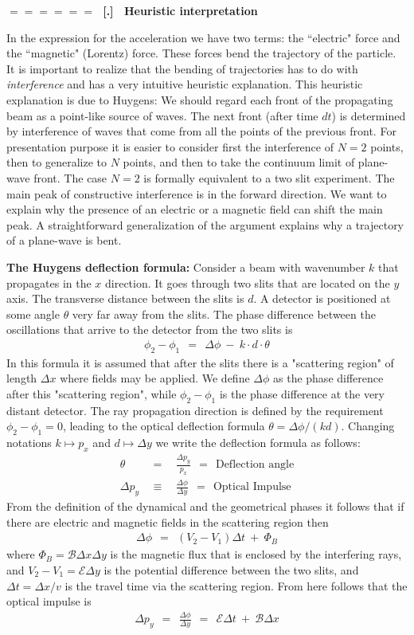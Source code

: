 \documentclass[onecolumn,fleqn]{revtex4}
\newcommand{\beq}{\begin{eqnarray}}
\newcommand{\eeq}{\end{eqnarray}}
\renewcommand{\thesubsection}{\arabic{subsection}}
\renewcommand{\thesubsubsection}{\arabic{subsubsection}}
\newcommand{\sheadC}[1]
{
\addtocounter{subsubsection}{1}
\vspace{5mm}
{\Large\bf $=\!=\!=\!=\!=\!=\;$ [\thesubsection.\thesubsubsection] \ #1}  
\nopagebreak
\phantomsection
}
\begin{document}
 
\sheadC{Heuristic interpretation}

In the expression for the acceleration we have two terms: 
the ``electric" force and the ``magnetic" (Lorentz) force.
These forces bend the trajectory of the particle.   
It is important to realize that the bending of trajectories 
has to do with {\em interference} and has a very intuitive 
heuristic explanation. This heuristic explanation is due to 
Huygens: We should regard each front of the propagating 
beam as a point-like source of waves. The next front (after time $dt$) 
is determined by interference of waves that come from all 
the points of the previous front. For presentation purpose 
it is easier to consider first the interference of $N=2$ points, 
then to generalize to $N$ points, and then to take 
the continuum limit of plane-wave front. 
The case $N=2$ is formally equivalent to a two slit experiment. 
The main peak of constructive interference is in the 
forward direction. We want to explain why the presence of 
an electric or a magnetic field can shift the main peak. 
A straightforward generalization of the argument explains 
why a trajectory of a plane-wave is bent. 


{\bf The Huygens deflection formula:}
Consider a beam with wavenumber $k$ that propagates in the $x$ direction.
It goes through two slits that are located on the $y$ axis. 
The transverse distance between the slits is ${d}$. 
A detector is positioned at some angle $\theta$ very far away from the slits.
The phase difference between the oscillations 
that arrive to the detector from the two slits is  
\beq
\phi_2-\phi_1 \ \ = \ \ \Delta \phi \ - \ k \cdot d \cdot \theta 
\eeq
In this formula it is assumed that after the slits there 
is a "scattering region" of length $\Delta x$ where fields 
may be applied. We define $\Delta \phi$ as the phase difference 
after this "scattering region", while  ${\phi_2-\phi_1}$ is the 
phase difference at the very distant detector.   
The ray propagation direction is defined by the requirement ${\phi_2-\phi_1=0}$, 
leading to the optical deflection formula $\theta=\Delta \phi/(kd)$. 
Changing notations ${k\mapsto p_x}$ and ${d\mapsto \Delta y}$ 
we write the deflection formula as follows:   
\beq
\theta \ \ &=& \ \ \frac{\Delta p_y}{p_x} \ \ = \ \ \mbox{Deflection angle}
\\
\Delta p_y \ \ &\equiv& \ \ \frac{\Delta \phi}{\Delta y} \ \ = \ \ \mbox{Optical Impulse} 
\eeq
From the definition of the dynamical and the geometrical phases 
it follows that if there are electric and magnetic fields in the 
scattering region then   
\beq
\Delta \phi \ \ = \ \ (V_2-V_1) \Delta t \ + \ \Phi_B
\eeq
where $\Phi_B = \mathcal{B}\Delta x\Delta y $ is the magnetic flux
that is enclosed by the interfering rays, 
and $V_2-V_1=\mathcal{E} \Delta y$ is the potential difference between the two slits, 
and $\Delta t = \Delta x / v$ is the travel time via the scattering region. 
From here follows that the optical impulse is 
\beq
\Delta p_y 
\ \ = \ \ \frac{\Delta \phi}{\Delta y}
\ \ = \ \ \mathcal{E} \Delta t \ + \ \mathcal{B}  \Delta x 
\eeq
\end{document}
